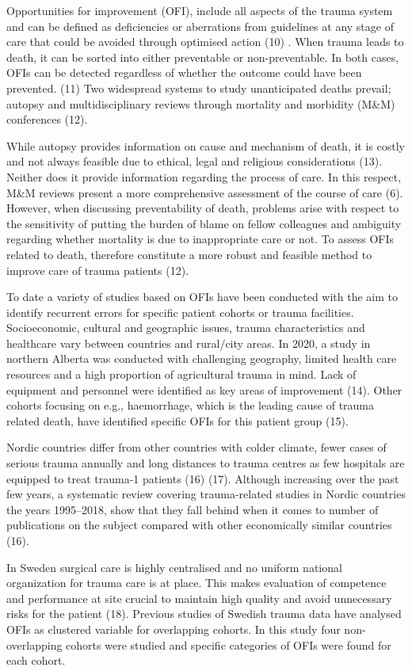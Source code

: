 \documentclass[
]{article}
\begin{document}
Opportunities for improvement (OFI), include all aspects of the trauma
system and can be defined as deficiencies or aberrations from guidelines
at any stage of care that could be avoided through optimised action (10)
. When trauma leads to death, it can be sorted into either preventable
or non-preventable. In both cases, OFIs can be detected regardless of
whether the outcome could have been prevented. (11) Two widespread
systems to study unanticipated deaths prevail; autopsy and
multidisciplinary reviews through mortality and morbidity (M\&M)
conferences (12).

While autopsy provides information on cause and mechanism of death, it
is costly and not always feasible due to ethical, legal and religious
considerations (13). Neither does it provide information regarding the
process of care. In this respect, M\&M reviews present a more
comprehensive assessment of the course of care (6). However, when
discussing preventability of death, problems arise with respect to the
sensitivity of putting the burden of blame on fellow colleagues and
ambiguity regarding whether mortality is due to inappropriate care or
not. To assess OFIs related to death, therefore constitute a more robust
and feasible method to improve care of trauma patients (12).

To date a variety of studies based on OFIs have been conducted with the
aim to identify recurrent errors for specific patient cohorts or trauma
facilities. Socioeconomic, cultural and geographic issues, trauma
characteristics and healthcare vary between countries and rural/city
areas. In 2020, a study in northern Alberta was conducted with
challenging geography, limited health care resources and a high
proportion of agricultural trauma in mind. Lack of equipment and
personnel were identified as key areas of improvement (14). Other
cohorts focusing on e.g., haemorrhage, which is the leading cause of
trauma related death, have identified specific OFIs for this patient
group (15).

Nordic countries differ from other countries with colder climate, fewer
cases of serious trauma annually and long distances to trauma centres as
few hospitals are equipped to treat trauma-1 patients (16) (17).
Although increasing over the past few years, a systematic review
covering trauma-related studies in Nordic countries the years
1995--2018, show that they fall behind when it comes to number of
publications on the subject compared with other economically similar
countries (16).

In Sweden surgical care is highly centralised and no uniform national
organization for trauma care is at place. This makes evaluation of
competence and performance at site crucial to maintain high quality and
avoid unnecessary risks for the patient (18). Previous studies of
Swedish trauma data have analysed OFIs as clustered variable for
overlapping cohorts. In this study four non-overlapping cohorts were
studied and specific categories of OFIs were found for each cohort.
\end{document}
